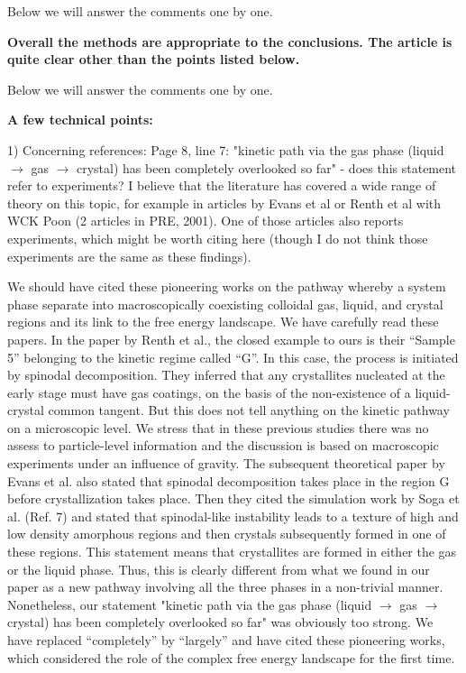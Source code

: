 \documentclass[11pt]{article}
\begin{document}
Below we will answer the comments one by one. 


\vspace{1em}

\singlespacing

{\bf
Overall the methods are appropriate to the conclusions. The article is quite clear other than the points listed below.
}


\bigskip
\doublespacing

Below we will answer the comments one by one. 


\vspace{1em}

\singlespacing

{\bf
A few technical points:

1) Concerning references: Page 8, line 7: "kinetic path via the gas phase (liquid $\rightarrow$ gas $\rightarrow$ crystal) has been completely overlooked so far" - does this statement refer to experiments? I believe that the literature has covered a wide range of theory on this topic, for example in articles by Evans et al or Renth et al with WCK Poon (2 articles in PRE, 2001). One of those articles also reports experiments, which might be worth citing here (though I do not think those experiments are the same as these findings).
}


\bigskip
\doublespacing
We should have cited these pioneering works on the pathway whereby a system phase separate into macroscopically coexisting colloidal gas, liquid, and crystal regions and its link to the free energy landscape. We have carefully read these papers. In the paper by Renth et al., the closed example to ours is their “Sample 5” belonging to the kinetic regime called “G”. In this case, the process is initiated by spinodal decomposition. They inferred that any crystallites nucleated at the early stage must have gas coatings, on the basis of the non-existence of a liquid-crystal common tangent. But this does not tell anything on the kinetic pathway on a microscopic level. We stress that in these previous studies there was no assess to particle-level information and the discussion is based on macroscopic experiments under an influence of gravity. The subsequent theoretical paper by Evans et al. also stated that spinodal decomposition takes place in the region G before crystallization takes place. Then they cited the 
simulation work by Soga et al. (Ref. 7) and stated that spinodal-like instability leads to a texture of high and low density amorphous regions and then crystals subsequently formed in one of these regions. This statement means that crystallites are formed in either the gas or the liquid phase. Thus, this is clearly different from what we found in our paper as a new pathway involving all the three phases in a non-trivial manner. 
Nonetheless, our statement "kinetic path via the gas phase (liquid $\rightarrow$ gas $\rightarrow$ crystal) has been completely overlooked so far" was obviously too strong. We have replaced “completely” by “largely” and have cited these pioneering works, which considered the role of the complex free energy landscape for the first time. 
\end{document}
